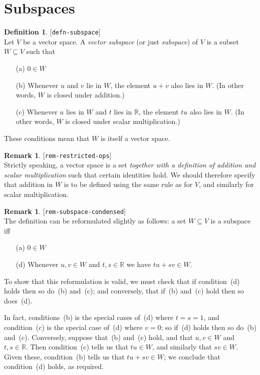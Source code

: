 \documentclass{amsart}
\newcommand{\lbl}[1]{\label{#1}\textup{[\texttt{#1}]}\ \\}
\newcommand{\lbl}{\label}
\newcommand{\R}         {{\mathbb{R}}}
\newcommand{\sse}       {\subseteq}
\renewcommand{\:}       {\colon}
\theoremstyle{definition}
\newtheorem{remark}[theorem]{Remark}
\newtheorem{definition}[theorem]{Definition}
\begin{document}
\section{Subspaces}
\label{sec-subspaces}

\begin{definition}\lbl{defn-subspace}
 Let $V$ be a vector space.  A \emph{vector subspace} (or just
 \emph{subspace}) of $V$ is a subset $W\sse V$ such that
 \begin{itemize}
  \item[(a)] $0\in W$
  \item[(b)] Whenever $u$ and $v$ lie in $W$, the element $u+v$ also
   lies in $W$.  (In other words, $W$ is closed under addition.)
  \item[(c)] Whenever $u$ lies in $W$ and $t$ lies in $\R$, the
   element $tu$ also lies in $W$.  (In other words, $W$ is
   closed under scalar multiplication.)
 \end{itemize}
 These conditions mean that $W$ is itself a vector space.
\end{definition}
\begin{remark}\lbl{rem-restricted-ops}
 Strictly speaking, a vector space is a set \emph{together
  with a definition of addition and scalar multiplication}
 such that certain identities hold.  We should therefore
 specify that addition in $W$ is to be defined using the
 same rule as for $V$, and similarly for scalar
 multiplication. 
\end{remark}
\begin{remark}\lbl{rem-subspace-condensed}
 The definition can be reformulated slightly as follows: a
 set $W\sse V$ is a subspace iff
 \begin{itemize}
  \item[(a)] $0\in W$
  \item[(d)] Whenever $u,v\in W$ and $t,s\in\R$ we have
   $tu+sv\in W$.
 \end{itemize}

 To show that this reformulation is valid, we must check
 that if condition~(d) holds then so do~(b) and~(c); and
 conversely, that if~(b) and~(c) hold then so does~(d).

 In fact, conditions~(b) is the special cases of~(d)
 where $t=s=1$, and condition~(c) is the special case of~(d)
 where $v=0$; so if~(d) holds then so do~(b) and~(c).
 Conversely, suppose that~(b) and~(c) hold, and that
 $u,v\in W$ and $t,s\in\R$.  Then condition~(c) tells us
 that $tu\in W$, and similarly that $sv\in W$.  Given these,
 condition~(b) tells us that $tu+sv\in W$; we conclude that
 condition~(d) holds, as required.
\end{remark}
\end{document}
